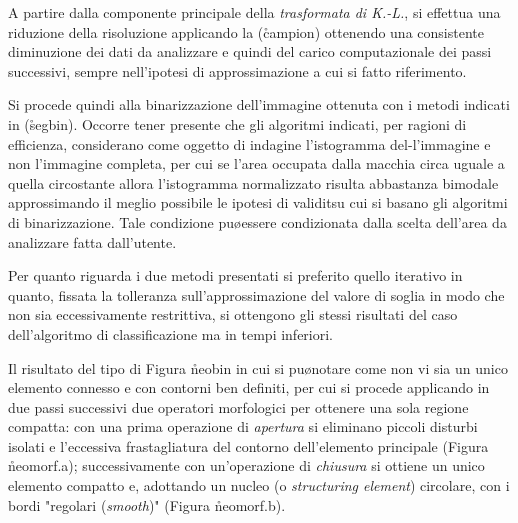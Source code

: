 A partire dalla componente principale della {\it trasformata di K.-L.}, si effettua una riduzione 
della risoluzione applicando la (\r{campion}) ottenendo una consistente
diminuzione dei dati da analizzare e quindi del carico computazionale dei passi
successivi, sempre nell'ipotesi di approssimazione a cui si \e fatto riferimento.

Si procede quindi alla binarizzazione dell'immagine ottenuta con
i metodi indicati in (\r{segbin}).
\boss
Occorre tener presente che gli algoritmi indicati, per ragioni di efficienza, considerano
come oggetto di indagine l'istogramma del-l'immagine e non l'immagine completa,
per cui se l'area occupata dalla macchia \e circa uguale a quella circostante allora
l'istogramma normalizzato risulta abbastanza bimodale approssimando il meglio
possibile le ipotesi di validit\a su cui si basano gli algoritmi di binarizzazione.
Tale condizione pu\o essere condizionata dalla scelta dell'area da analizzare fatta
dall'utente.
\eoss

Per quanto riguarda i due metodi presentati si \e preferito quello iterativo in quanto,
fissata la tolleranza sull'approssimazione del valore di soglia in modo che non sia
eccessivamente restrittiva, si ottengono gli stessi risultati del caso dell'algoritmo di
classificazione ma in tempi inferiori.



Il risultato \e del tipo di Figura \r{neobin} in cui si pu\o notare come
non vi sia un unico elemento connesso e con contorni ben definiti, per cui si procede 
applicando in due passi successivi due operatori morfologici per ottenere una sola regione
compatta:
\ben
\im con una prima operazione di {\it apertura} si eliminano piccoli disturbi isolati e 
    l'eccessiva frastagliatura del contorno dell'elemento principale (Figura \r{neomorf}.a);
\im successivamente con un'operazione di {\it chiusura} si ottiene un unico elemento 
    compatto e, adottando un nucleo (o {\it structuring element}) circolare, con i bordi "regolari
    ({\it smooth})" (Figura \r{neomorf}.b).
\een

